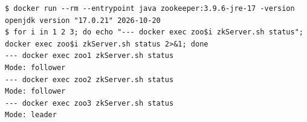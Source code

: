 \begin{Verbatim}
$ docker run --rm --entrypoint java zookeeper:3.9.6-jre-17 -version
openjdk version "17.0.21" 2026-10-20
$ for i in 1 2 3; do echo "--- docker exec zoo$i zkServer.sh status"; docker exec zoo$i zkServer.sh status 2>&1; done
--- docker exec zoo1 zkServer.sh status
Mode: follower
--- docker exec zoo2 zkServer.sh status
Mode: follower
--- docker exec zoo3 zkServer.sh status
Mode: leader
\end{Verbatim}
